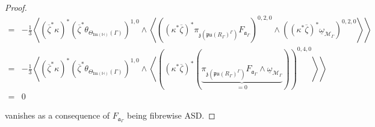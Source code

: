 \documentclass[10pt,a4paper]{amsart}
\newcommand{\m}[1]{{\mathrm{#1}}}
\begin{document}
\begin{proof}
\begin{align*}
    =&-\frac{1}{3}\left<(\overline{\zeta}^*\kappa)^*(\overline{\zeta}^*\theta_{\Theta_{\m{Im}(\mathbb{H})}(\Gamma)})^{1,0}\wedge\left<((\kappa^*\overline{\zeta})^*\pi_{\mathfrak{z}(\mathfrak{pu}(R_\Gamma)^{\Gamma})}F_{\mathfrak{a}_\Gamma})^{0,2,0}\wedge((\kappa^*\overline{\zeta})^*\underline{\omega}_{\mathcal{M}_\Gamma})^{0,2,0}\right>\right>\\
    =&-\frac{1}{3}\left<(\overline{\zeta}^*\kappa)^*(\overline{\zeta}^*\theta_{\Theta_{\m{Im}(\mathbb{H})}(\Gamma)})^{1,0}\wedge\left<((\kappa^*\overline{\zeta})^*(\underbrace{\pi_{\mathfrak{z}(\mathfrak{pu}(R_\Gamma)^{\Gamma})}F_{\mathfrak{a}_\Gamma}\wedge\underline{\omega}_{\mathcal{M}_\Gamma}}_{=0}))^{0,4,0}\right>\right>\\
    =&0
\end{align*}

vanishes as a consequence of $F_{\mathfrak{a}_\Gamma}$ being fibrewise ASD.
\end{proof}
\end{document}
